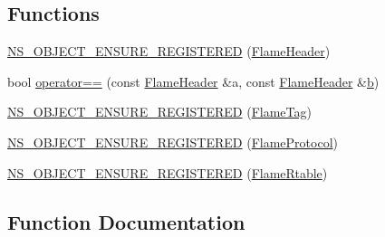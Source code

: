 \subsection*{Functions}
\begin{DoxyCompactItemize}
\item 
\hyperlink{namespacens3_1_1flame_ab6fec530f3dfe9e6492d5cf495fb5b35}{N\+S\+\_\+\+O\+B\+J\+E\+C\+T\+\_\+\+E\+N\+S\+U\+R\+E\+\_\+\+R\+E\+G\+I\+S\+T\+E\+R\+ED} (\hyperlink{classns3_1_1flame_1_1FlameHeader}{Flame\+Header})
\item 
bool \hyperlink{namespacens3_1_1flame_a3b57e289b5f1e5ab8babfe2484ea5af8}{operator==} (const \hyperlink{classns3_1_1flame_1_1FlameHeader}{Flame\+Header} \&a, const \hyperlink{classns3_1_1flame_1_1FlameHeader}{Flame\+Header} \&\hyperlink{lte__pathloss_8m_a21ad0bd836b90d08f4cf640b4c298e7c}{b})
\item 
\hyperlink{namespacens3_1_1flame_ae4125fe7c0682de529686e4c1bdef070}{N\+S\+\_\+\+O\+B\+J\+E\+C\+T\+\_\+\+E\+N\+S\+U\+R\+E\+\_\+\+R\+E\+G\+I\+S\+T\+E\+R\+ED} (\hyperlink{classns3_1_1flame_1_1FlameTag}{Flame\+Tag})
\item 
\hyperlink{namespacens3_1_1flame_ac58feec63a0d8e7dd583ad970c114b93}{N\+S\+\_\+\+O\+B\+J\+E\+C\+T\+\_\+\+E\+N\+S\+U\+R\+E\+\_\+\+R\+E\+G\+I\+S\+T\+E\+R\+ED} (\hyperlink{classns3_1_1flame_1_1FlameProtocol}{Flame\+Protocol})
\item 
\hyperlink{namespacens3_1_1flame_a7fb2707e1cdf8b97cd8a0e9b490e5470}{N\+S\+\_\+\+O\+B\+J\+E\+C\+T\+\_\+\+E\+N\+S\+U\+R\+E\+\_\+\+R\+E\+G\+I\+S\+T\+E\+R\+ED} (\hyperlink{classns3_1_1flame_1_1FlameRtable}{Flame\+Rtable})
\end{DoxyCompactItemize}


\subsection{Function Documentation}
